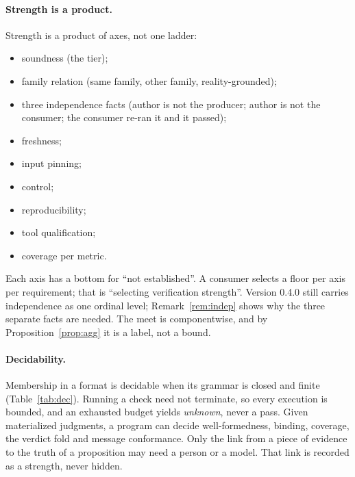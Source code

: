 \documentclass[11pt]{article}
\theoremstyle{definition}
\theoremstyle{remark}
\begin{document}
\paragraph{Strength is a product.} Strength is a product of axes, not one ladder:
\begin{itemize}[itemsep=1pt]
\item soundness (the tier);
\item family relation (same family, other family, reality-grounded);
\item three independence facts (author is not the producer; author is not the consumer; the
  consumer re-ran it and it passed);
\item freshness;
\item input pinning;
\item control;
\item reproducibility;
\item tool qualification;
\item coverage per metric.
\end{itemize}
Each axis has a bottom for ``not established''. A consumer selects a floor per axis per
requirement; that is ``selecting verification strength''. Version 0.4.0 still carries
independence as one ordinal level; Remark~\ref{rem:indep} shows why the three separate facts are
needed. The meet is componentwise, and by
Proposition~\ref{prop:agg} it is a label, not a bound.

\paragraph{Decidability.} Membership in a format is decidable when its grammar is closed and
finite (Table~\ref{tab:dec}). Running a check need not terminate, so every execution is bounded,
and an exhausted budget yields \emph{unknown}, never a pass. Given materialized judgments, a
program can decide well-formedness, binding, coverage, the verdict fold and message conformance.
Only the link from a piece of evidence to the truth of a proposition may need a person or a model.
That link is recorded as a strength, never hidden.
\end{document}
